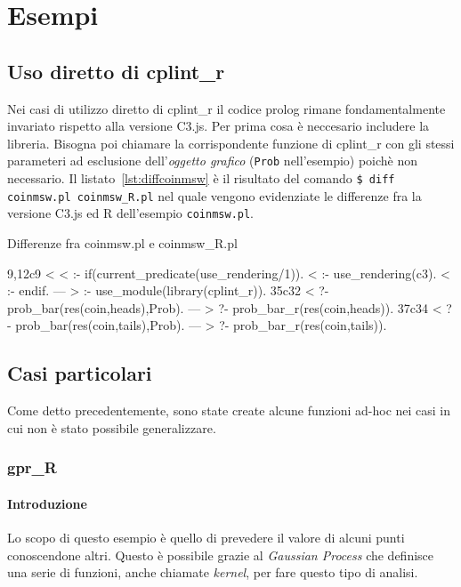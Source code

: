\documentclass[10pt,titlepage,twoside,a4paper]{report}
\newenvironment{code}{\singlespacing\captionsetup{type=listing}}{}
\begin{document}


\chapter{Esempi}
\label{ch:esempi}

\section{Uso diretto di cplint\_r}
Nei casi di utilizzo diretto di cplint\_r il codice prolog rimane 
fondamentalmente invariato rispetto alla  versione C3.js. Per prima cosa è 
neccesario includere la libreria. Bisogna poi chiamare la corrispondente 
funzione di cplint\_r con gli stessi parameteri ad esclusione 
dell'\emph{oggetto grafico} (\texttt{Prob} nell'esempio) poichè non 
necessario. Il listato~\ref{lst:diffcoinmsw} è il risultato del comando
\texttt{\$ diff coinmsw.pl coinmsw\_R.pl}
nel quale vengono evidenziate le differenze fra la versione C3.js 
\cite{coinmswpl} ed R \cite{coinmswrpl} dell'esempio \texttt{coinmsw.pl}.

\begin{code}
\caption{Differenze fra coinmsw.pl e coinmsw\_R.pl}
\label{lst:diffcoinmsw}
\begin{prologcode*}{}
9,12c9
< 
< :- if(current_predicate(use_rendering/1)).
< :- use_rendering(c3).
< :- endif.
---
> :- use_module(library(cplint_r)).
35c32
< ?- prob_bar(res(coin,heads),Prob).  %
---
> ?- prob_bar_r(res(coin,heads)).  %
37c34
< ?- prob_bar(res(coin,tails),Prob).  %
---
> ?- prob_bar_r(res(coin,tails)).  %
\end{prologcode*}
\end{code}

\section{Casi particolari} \label{sec:casiParticolari}
Come detto precedentemente, sono state create alcune funzioni ad-hoc
nei casi in cui non è stato possibile generalizzare.

\subsection{gpr\_R}
\subsubsection{Introduzione}
Lo scopo di questo esempio è quello di prevedere il valore di alcuni punti 
conoscendone altri. Questo è possibile grazie al \emph{Gaussian Process} che 
definisce una serie di funzioni, anche chiamate \emph{kernel}, per fare questo 
tipo di analisi.
\end{document}
